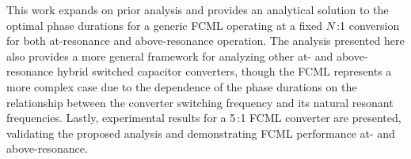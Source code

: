 

This work expands on prior analysis and provides an analytical solution to the optimal phase durations for a generic FCML operating at a fixed $N$\,:1 conversion for both at-resonance and above-resonance operation.
The analysis presented here also provides a more general framework for analyzing other at- and above-resonance hybrid switched capacitor converters, though the FCML represents a more complex case due to the dependence of the phase durations on the relationship between the converter switching frequency and its natural resonant frequencies.
Lastly, experimental results for a 5\,:1 FCML converter are presented, validating the proposed analysis and demonstrating FCML performance at- and above-resonance.












